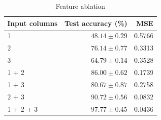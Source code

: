 \begin{table}[htbp]
\centering
\caption{Feature ablation}
\label{tab:feature}
\small
\begin{tabular}{lrr}
\toprule
Input columns & Test accuracy (\%) & MSE \\
\midrule
1 & $48.14 \pm 0.29$ & 0.5766 \\
2 & $76.14 \pm 0.77$ & 0.3313 \\
3 & $64.79 \pm 0.14$ & 0.3528 \\
1 + 2 & $86.00 \pm 0.62$ & 0.1739 \\
1 + 3 & $80.67 \pm 0.87$ & 0.2758 \\
2 + 3 & $90.72 \pm 0.56$ & 0.0832 \\
1 + 2 + 3 & $97.77 \pm 0.45$ & 0.0436 \\
\bottomrule
\end{tabular}
\end{table}
